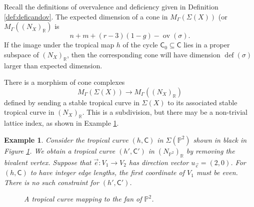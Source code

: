 \documentclass{article}
\def\R{\mathbb{R}}
\def\P{\mathbb{P}}
\newtheorem{example}[definition]{Example}
\newcommand{\tropC}{\mathsf{C}}
\newcommand{\defic}[1]{\operatorname{def}(#1)}
\newcommand{\ov}[1]{\operatorname{ov}(#1)}
\begin{document}
    Recall the definitions of overvalence and deficiency given in Definition \ref{def:deficandov}. 
    The expected dimension of a cone in $M_\Gamma(\Sigma(X))$ (or $M_\Gamma((N_X)_\R)$ is $$n+ m+(r-3)(1-g)- \ov{\sigma} .$$ 
    If the image under the tropical map $h$ of the cycle $\tropC_0 \subseteq \mathsf{C}$ lies in a proper subspace of $(N_X)_{\mathbb{R}}$, then the corresponding cone will have dimension $\defic{\sigma}$ larger than expected dimension. 


    There is a morphism of cone complexes 
    \begin{equation} \label{eqn: forgetfan}
    M_\Gamma(\Sigma(X)) \rightarrow M_\Gamma((N_X)_{\mathbb{R}})
    \end{equation}
    defined by sending a stable tropical curve in $\Sigma(X)$ to its associated stable tropical curve in $(N_X)_{\mathbb{R}}$. This is a subdivision, but there may be a non-trivial lattice index, as shown in Example \ref{exa:dilation}.

    \begin{example} \label{exa:dilation}
        Consider the tropical curve $(h,\tropC)$ in $\Sigma(\mathbb{P}^2)$ shown in black in Figure \ref{fig:difflat}. We obtain a tropical curve $(h',\tropC')$ in $(N_{\P^2})_{\mathbb{R}}$  by removing the bivalent vertex. Suppose that $\vec{e}: V_1 \to V_2$ has direction vector $u_{\vec{e}}=(2,0)$. For $(h,\tropC)$ to have integer edge lengths, the first coordinate of $V_1$ must be even. There is no such constraint for $(h',\tropC')$. 

        \begin{figure}[h]
    			\centering
    			\caption{A tropical curve mapping to the fan of $\mathbb{P}^2$.}
    			\label{fig:difflat}
    		  \end{figure}
    \end{example}
\end{document}
